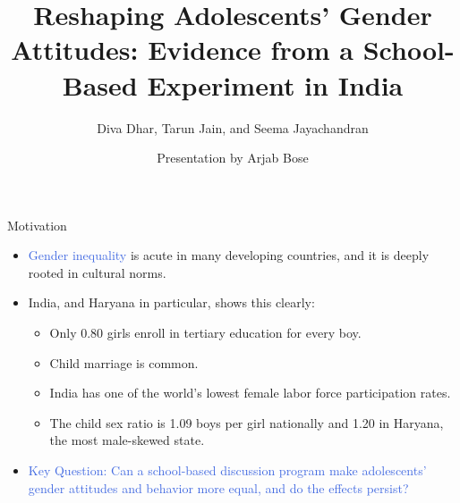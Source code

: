 \documentclass[aspectratio=169,11pt]{beamer}
\title{Reshaping Adolescents’ Gender Attitudes: Evidence from a School-Based Experiment in India}
\author{Diva Dhar, Tarun Jain, and Seema Jayachandran}
\institute[Your University]{\large AER 2022}
\date{Presentation by Arjab Bose}
\begin{document}
\begin{frame}
  \titlepage
\end{frame}

\begin{frame}{Motivation}
  \begin{itemize}
    \item  \textcolor{RoyalBlue}{Gender inequality} is acute in many developing countries, and it is deeply rooted in cultural norms.
   
    
    
   
   \item India, and Haryana in particular, shows this clearly:
      \begin{itemize}
        \item Only 0.80 girls enroll in tertiary education for every boy. 
        \item Child marriage is common. 
        \item India has one of the world's lowest female labor force participation rates.
        \item The child sex ratio is 1.09 boys per girl nationally and 1.20 in Haryana, the most male-skewed state. 
      \end{itemize}
    
    
    \item \textcolor{RoyalBlue}{Key Question: Can a school-based discussion program make adolescents' gender attitudes and behavior more equal, and do the effects persist?}
    
  \end{itemize}
\end{frame}
\end{document}
